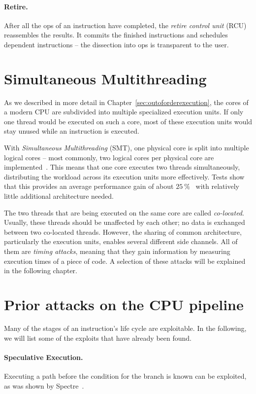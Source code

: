 \documentclass[11pt,
  titlepage=false,
  parskip=half,      %
]{scrreprt}
\begin{document}
\paragraph{Retire.}
After all the \textmu ops of an instruction have completed, the \textit{retire control unit} (RCU) reassembles the results.
It commits the finished instructions and schedules dependent instructions -- the dissection into \textmu ops is transparent to the user.

\section{Simultaneous Multithreading}
\label{sec:smt}

As we described in more detail in Chapter~\ref{sec:outoforderexecution},
the cores of a modern CPU are subdivided into multiple specialized execution units.
If only one thread would be executed on such a core,
most of these execution units would stay unused while an instruction is executed.

With \textit{Simultaneous Multithreading} (SMT), one physical core is split into multiple logical cores
-- most commonly, two logical cores per physical core are implemented~\cite{tullsen1995simultaneous}.
This means that one core executes two threads simultaneously, distributing the workload across its execution units more effectively.
Tests show that this provides an average performance gain of about $25~\%$~\cite{Phoronix2018HT, Cutress2020SMT}
with relatively little additional architecture needed.

The two threads that are being executed on the same core are called \textit{co-located}.
Usually, these threads should be unaffected by each other; no data is exchanged between two co-located threads.
However, the sharing of common architecture, particularly the execution units, enables several different side channels.
All of them are \textit{timing attacks}, meaning that they gain information by measuring execution times of a piece of code.
A selection of these attacks will be explained in the following chapter.

\section{Prior attacks on the CPU pipeline }
\label{sec:exploits}
Many of the stages of an instruction's life cycle are exploitable.
In the following, we will list some of the exploits that have already been found.

\paragraph{Speculative Execution.}
Executing a path before the condition for the branch is known
can be exploited, as was shown by Spectre~\cite{spKocherHFGGHHLM019}.
\end{document}
